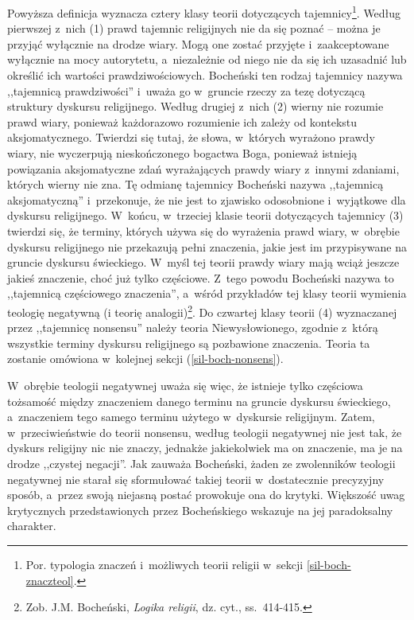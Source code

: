 Powyższa definicja wyznacza cztery klasy teorii dotyczących tajemnicy\footnote{Por. typologia znaczeń i~możliwych teorii religii w~sekcji \ref{sil-boch-znaczteol}.}. Według pierwszej z~nich (1) prawd tajemnic religijnych nie da się poznać -- można je przyjąć wyłącznie na drodze wiary. Mogą one zostać przyjęte i~zaakceptowane wyłącznie na mocy autorytetu, a~niezależnie od niego nie da się ich uzasadnić lub określić ich wartości prawdziwościowych. Bocheński ten rodzaj tajemnicy nazywa ,,tajemnicą prawdziwości'' i~uważa go w~gruncie rzeczy za tezę dotyczącą struktury dyskursu religijnego. Według drugiej z~nich (2) wierny nie rozumie prawd wiary, ponieważ każdorazowo rozumienie ich zależy od kontekstu aksjomatycznego. Twierdzi się tutaj, że słowa, w~których wyrażono prawdy wiary, nie wyczerpują nieskończonego bogactwa Boga, ponieważ istnieją powiązania aksjomatyczne zdań wyrażających prawdy wiary z~innymi zdaniami, których wierny nie zna. Tę odmianę tajemnicy Bocheński nazywa ,,tajemnicą aksjomatyczną'' i~przekonuje, że nie jest to zjawisko odosobnione i~wyjątkowe dla dyskursu religijnego. W~końcu, w~trzeciej klasie teorii dotyczących tajemnicy (3) twierdzi się, że terminy, których używa się do wyrażenia prawd wiary, w~obrębie dyskursu religijnego nie przekazują pełni znaczenia, jakie jest im przypisywane na gruncie dyskursu świeckiego. W~myśl tej teorii prawdy wiary mają wciąż jeszcze jakieś znaczenie, choć już tylko częściowe. Z~tego powodu Bocheński nazywa to ,,tajemnicą częściowego znaczenia'', a~wśród przykładów tej klasy teorii wymienia teologię negatywną (i teorię analogii)\footnote{Zob. J.M. Bocheński, \textit{Logika religii}, dz. cyt., ss.~414-415.}. Do czwartej klasy teorii (4) wyznaczanej przez ,,tajemnicę nonsensu'' należy teoria Niewysłowionego, zgodnie z~którą wszystkie terminy dyskursu religijnego są pozbawione znaczenia. Teoria ta zostanie omówiona w~kolejnej sekcji (\ref{sil-boch-nonsens}).

W~obrębie teologii negatywnej uważa się więc, że istnieje tylko częściowa tożsamość między znaczeniem danego terminu na gruncie dyskursu świeckiego, a~znaczeniem tego samego terminu użytego w~dyskursie religijnym. Zatem, w~przeciwieństwie do teorii nonsensu, według teologii negatywnej nie jest tak, że dyskurs religijny nic nie znaczy, jednakże jakiekolwiek ma on znaczenie, ma je na drodze ,,czystej negacji''. Jak zauważa Bocheński, żaden ze zwolenników teologii negatywnej nie starał się sformułować takiej teorii w~dostatecznie precyzyjny sposób, a~przez swoją niejasną postać prowokuje ona do krytyki. Większość uwag krytycznych przedstawionych przez Bocheńskiego wskazuje na jej paradoksalny charakter.

